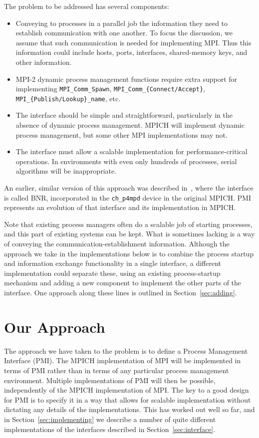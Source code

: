 \documentclass[11pt]{article}
\begin{document}
The problem to be addressed has several components:
\begin{itemize}
\item Conveying to processes in a parallel job the information they need
  to establish communication with one another.  To focus the discussion,
  we assume that such communication is needed for implementing MPI.
  Thus this information could include hosts, ports, interfaces,
  shared-memory keys, and other information.
\item MPI-2 dynamic process management functions require extra support
  for implementing {\tt MPI\_Comm\_Spawn}, {\tt MPI\_Comm\_\{Connect/Accept\}},
  {\tt MPI\_\{Publish/Lookup\}\_name}, etc.
\item The interface should be simple and straightforward, particularly
  in the absence of dynamic process management.  MPICH will implement
  dynamic process management, but some other MPI implementations may
  not.
\item The interface must allow a scalable implementation for
  performance-critical operations.  In environments with even only hundreds
  of processes, serial algorithms will be inappropriate.
\end{itemize}
An earlier, similar version of this approach was described
in~\cite{butler-lusk-gropp:mpd-parcomp}, where the interface is called
BNR, incorporated in the {\tt ch\_p4mpd} device in the original MPICH.  PMI
represents an evolution of that interface and its implementation in MPICH.

Note that existing process managers often do a scalable job of starting
processes, and this part of existing systems can be kept.  What is
sometimes lacking is a way of conveying the communication-establishment
information.  Although the approach we take in the implementations below
is to combine the process startup and information exchange functionality
in a single interface, a different implementation could separate these,
using an existing process-startup mechanism and adding a new component
to implement the other parts of the interface.  One approach along these
lines is outlined in Section~\ref{sec:adding}.

\section{Our Approach}
\label{sec:approach}

The approach we have taken to the problem is to define a Process
Management Interface (PMI).  The MPICH implementation of MPI will be
implemented in terms of PMI rather than in terms of any particular
process management environment.  Multiple implementations of PMI will
then be possible, independently of the MPICH implementation of MPI.
The key to a good design for PMI is to specify it in a way that allows for
scalable implementation without dictating any details of the
implementations.  This has worked out well so far, and in
Section~\ref{sec:implementing} we describe a number of quite different
implementations of the interfaces described in Section~\ref{sec:interface}.
\end{document}
